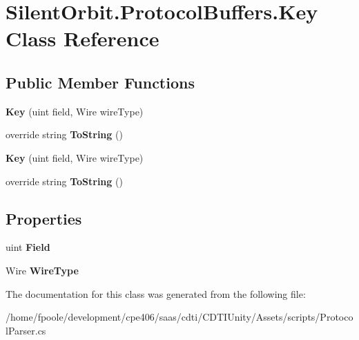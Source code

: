 \hypertarget{class_silent_orbit_1_1_protocol_buffers_1_1_key}{}\section{Silent\+Orbit.\+Protocol\+Buffers.\+Key Class Reference}
\label{class_silent_orbit_1_1_protocol_buffers_1_1_key}
\subsection*{Public Member Functions}
\begin{DoxyCompactItemize}
\item 
\hypertarget{class_silent_orbit_1_1_protocol_buffers_1_1_key_afec25f3e95b45ea1637725a855e81360}{}{\bfseries Key} (uint field, Wire wire\+Type)\label{class_silent_orbit_1_1_protocol_buffers_1_1_key_afec25f3e95b45ea1637725a855e81360}

\item 
\hypertarget{class_silent_orbit_1_1_protocol_buffers_1_1_key_ae46395a4028f035c19a07caa680f1ad0}{}override string {\bfseries To\+String} ()\label{class_silent_orbit_1_1_protocol_buffers_1_1_key_ae46395a4028f035c19a07caa680f1ad0}

\item 
\hypertarget{class_silent_orbit_1_1_protocol_buffers_1_1_key_afec25f3e95b45ea1637725a855e81360}{}{\bfseries Key} (uint field, Wire wire\+Type)\label{class_silent_orbit_1_1_protocol_buffers_1_1_key_afec25f3e95b45ea1637725a855e81360}

\item 
\hypertarget{class_silent_orbit_1_1_protocol_buffers_1_1_key_ae46395a4028f035c19a07caa680f1ad0}{}override string {\bfseries To\+String} ()\label{class_silent_orbit_1_1_protocol_buffers_1_1_key_ae46395a4028f035c19a07caa680f1ad0}

\end{DoxyCompactItemize}
\subsection*{Properties}
\begin{DoxyCompactItemize}
\item 
\hypertarget{class_silent_orbit_1_1_protocol_buffers_1_1_key_a633f5ab095f7ed07ae3767d719834747}{}uint {\bfseries Field}\label{class_silent_orbit_1_1_protocol_buffers_1_1_key_a633f5ab095f7ed07ae3767d719834747}

\item 
\hypertarget{class_silent_orbit_1_1_protocol_buffers_1_1_key_a0080c3bd74cda7b92d7066cdeb25f819}{}Wire {\bfseries Wire\+Type}\label{class_silent_orbit_1_1_protocol_buffers_1_1_key_a0080c3bd74cda7b92d7066cdeb25f819}

\end{DoxyCompactItemize}


The documentation for this class was generated from the following file\+:\begin{DoxyCompactItemize}
\item 
/home/fpoole/development/cpe406/saas/cdti/\+C\+D\+T\+I\+Unity/\+Assets/scripts/Protocol\+Parser.\+cs\end{DoxyCompactItemize}
